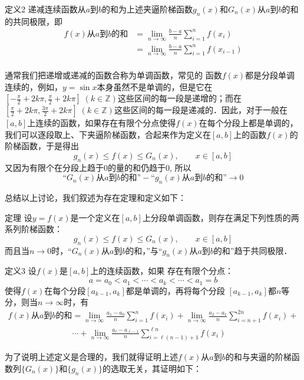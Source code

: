 \begin{blk}
    {定义2} 递减连续函数从$a$到$b$的和为上述夹逼阶梯函数$g_n(x)$和$G_n(x)$从$a$到$b$的和的共同极限，即  
\[\begin{split}
    f(x)\text{从$a$到$b$的和}&=\lim_{n\to\infty} \frac{b-a}{n}\sum^n_{i=1}f(x_i)\\
    &=\lim_{n\to\infty} \frac{b-a}{n}\sum^n_{i=1}f(x_{i-1})\\
\end{split}\]
\end{blk}

通常我们把递增或递减的函数合称为单调函数，常见的
函数$f(x)$都是分段单调连续的，例如，$y=\sin x$本身虽然不是单调的，但是它在$\left[-\frac{\pi}{2}+2k\pi,\frac{\pi}{2}+2k\pi\right]\; (k\in\mathbb{Z})$这些区间的每一段是递增的；而在$\left[\frac{\pi}{2}+2k\pi,\frac{3\pi}{2}+2k\pi\right]\; (k\in\mathbb{Z})$这些区间的每一段是递减的．因此，对于一般在$[a,b]$上连续的函数，如果存在有限个分点使得$f(x)$在每个分段上都是单调的，我们可以逐段取上、下夹逼阶梯函数，合起来作为定义在$[a,b]$上的函数$f(x)$的阶梯函数，于是得出
\[g_n (x)\le f(x)\le G_n(x),\qquad x\in [a,b]\]
又因为有限个在分段上趋于0的量的和仍趋于0, 所以
\[\text{“$G_n(x)$从$a$到$b$的和”}-\text{“$g_n(x)$从$a$到$b$的和”}\to 0\]

总结以上讨论，我们叙述为存在定理和定义如下：

\begin{blk}
    {定理} 设$y=f(x)$是一个定义在$[a,b]$上分段单调函数，则存在满足下列性质的两系列阶梯函数：
    \[g_n(x)\le f(x)\le G_n(x),\qquad x\in[a,b]\]
而且当$n\to 0$时，“$G_n(x)$从$a$到$b$的和，”与“$g_n(x)$从$a$到$b$的和”趋于共同极限．
\end{blk}


\begin{blk}
    {定义3} 设$f(x)$是$[a,b]$上的连续函数，如果 存在有限个分点：
\[a=a_0<a_1<\cdots<a_k<\cdots<a_1=b\]
使得$f(x)$在每个分段$[a_{k-1},a_k]$都是单调的，再将每个分段
    $[a_{k-1},a_k]$都$n$等分，则当$n\to\infty$时，有
\[\begin{split}
f(x)\text{从$a$到$b$的和}&=\lim_{n\to\infty}\frac{a_1-a_0}{n}\sum^n_{i=1}f(x_i)+\lim_{n\to\infty}\frac{a_2-a_1}{n}\sum^{2n}_{i=n+1}f(x_i)+\\
&\cdots +\lim_{n\to\infty}\frac{a_\ell-a_{\ell-1}}{n}\sum^{\ell n}_{i=\ell(n-1)+1}f(x_i)
\end{split}\]
\end{blk}

为了说明上述定义是合理的，我们就得证明上述$f(x)$从$a$到$b$的和与夹逼的阶梯函数列$\{G_n(x)\}$和$\{g_n(x)\}$的选取无关，其证明如下：

